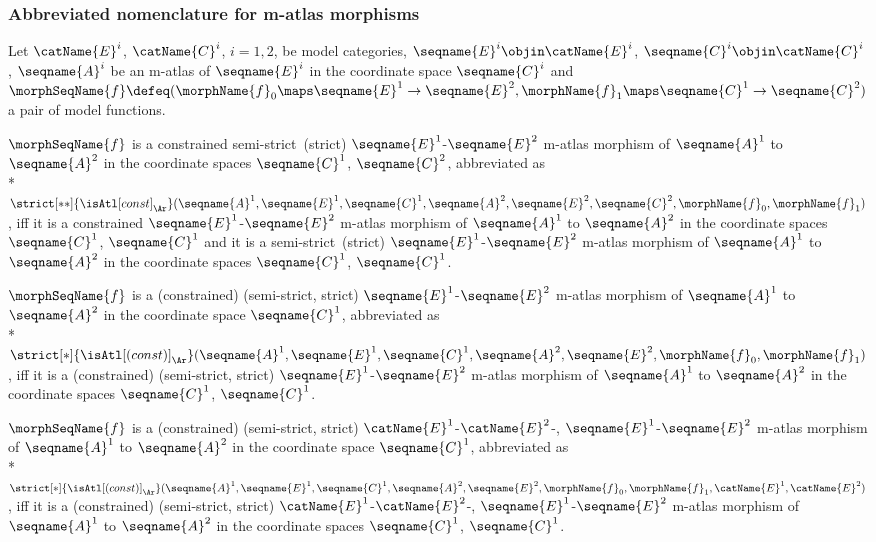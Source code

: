 \documentclass{article}
\begin{document}
\subsubsection{Abbreviated nomenclature for m-atlas morphisms}
\begin{definition}
\label{def:M-ATLmorphabbrev}

Let $\catName{E}^i$, $\catName{C}^i$, $i=1,2$, be model categories,
$\seqname{E}^i \objin \catName{E}^i$,
$\seqname{C}^i \objin \catName{C}^i$, $\seqname{A}^i$ be an m-atlas of
$\seqname{E}^i$ in the coordinate space $\seqname{C}^i$ and
$
  \morphSeqName{f} \defeq
  (
    \morphName{f}_0 \maps \seqname{E}^1 \to \seqname{E}^2,
    \morphName{f}_1 \maps \seqname{C}^1 \to \seqname{C}^2
  )
$
a pair of model functions.

$\morphSeqName{f}$ is a constrained semi-strict~(strict)
$\seqname{E}^1$-$\seqname{E}^2$ m-atlas morphism of
$\seqname{A}^1$ to $\seqname{A}^2$ in the coordinate spaces
$\seqname{C}^1$, $\seqname{C}^2$, abbreviated as \\*
$
  \strict[**]{\isAtl[const]_\Ar}
  (
    \seqname{A}^1,
    \seqname{E}^1,
    \seqname{C}^1,
    \seqname{A}^2,
    \seqname{E}^2,
    \seqname{C}^2,
    \morphName{f}_0,
    \morphName{f}_1
  )
$,
iff it is a constrained $\seqname{E}^1$-$\seqname{E}^2$ m-atlas
morphism of $\seqname{A}^1$ to $\seqname{A}^2$ in the coordinate spaces
$\seqname{C}^1$, $\seqname{C}^1$ and it is a semi-strict~(strict)
$\seqname{E}^1$-$\seqname{E}^2$ m-atlas morphism of
$\seqname{A}^1$ to $\seqname{A}^2$ in the coordinate spaces
$\seqname{C}^1$, $\seqname{C}^1$.

$\morphSeqName{f}$ is a (constrained) (semi-strict, strict)
$\seqname{E}^1$-$\seqname{E}^2$ m-atlas morphism of
$\seqname{A}^1$ to $\seqname{A}^2$ in the coordinate space
$\seqname{C}^1$, abbreviated as \\*
$
  \strict[*]{\isAtl[(const)]_\Ar}
  (
    \seqname{A}^1,
    \seqname{E}^1,
    \seqname{C}^1,
    \seqname{A}^2,
    \seqname{E}^2,
    \morphName{f}_0,
    \morphName{f}_1
  )
$,
iff it is a (constrained) (semi-strict, strict)
$\seqname{E}^1$-$\seqname{E}^2$ m-atlas morphism of
$\seqname{A}^1$ to $\seqname{A}^2$ in the coordinate spaces
$\seqname{C}^1$, $\seqname{C}^1$.

$\morphSeqName{f}$ is a (constrained) (semi-strict, strict)
\nobreaks
  {
    $\catName{E}^1$-$\catName{E}^2$-,
    $\seqname{E}^1$-$\seqname{E}^2$
  }
m-atlas morphism of $\seqname{A}^1$ to $\seqname{A}^2$ in the
coordinate space $\seqname{C}^1$, abbreviated as \\*
$
  \strict[*]{\isAtl[(const)]_\Ar}
  (
    \seqname{A}^1,
    \seqname{E}^1,
    \seqname{C}^1,
    \seqname{A}^2,
    \seqname{E}^2,
    \morphName{f}_0,
    \morphName{f}_1,
    \catName{E}^1,
    \catName{E}^2
  )
$,
iff it is a (constrained) (semi-strict, strict)
\nobreaks
  {
    {$\catName{E}^1$-$\catName{E}^2$-},
    {$\seqname{E}^1$-$\seqname{E}^2$}
  }
m-atlas morphism of $\seqname{A}^1$ to $\seqname{A}^2$ in
the coordinate spaces $\seqname{C}^1$, $\seqname{C}^1$.


\end{definition}
\end{document}
